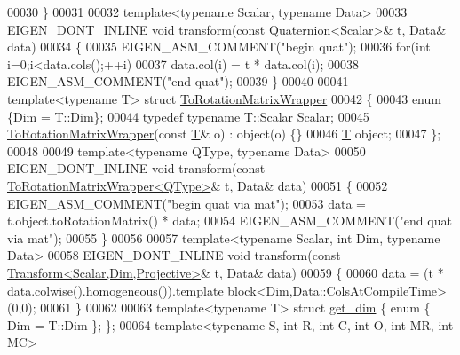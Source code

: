\begin{DoxyCode}
00030 \}
00031 
00032 \textcolor{keyword}{template}<\textcolor{keyword}{typename} Scalar, \textcolor{keyword}{typename} Data>
00033 EIGEN\_DONT\_INLINE \textcolor{keywordtype}{void} transform(\textcolor{keyword}{const} \hyperlink{group___geometry___module_class_eigen_1_1_quaternion}{Quaternion<Scalar>}& t, Data& data)
00034 \{
00035   EIGEN\_ASM\_COMMENT(\textcolor{stringliteral}{"begin quat"});
00036   \textcolor{keywordflow}{for}(\textcolor{keywordtype}{int} i=0;i<data.cols();++i)
00037     data.col(i) = t * data.col(i);
00038   EIGEN\_ASM\_COMMENT(\textcolor{stringliteral}{"end quat"});
00039 \}
00040 
00041 \textcolor{keyword}{template}<\textcolor{keyword}{typename} T> \textcolor{keyword}{struct }\hyperlink{struct_to_rotation_matrix_wrapper}{ToRotationMatrixWrapper}
00042 \{
00043   \textcolor{keyword}{enum} \{Dim = T::Dim\};
00044   \textcolor{keyword}{typedef} \textcolor{keyword}{typename} T::Scalar Scalar;
00045   \hyperlink{struct_to_rotation_matrix_wrapper}{ToRotationMatrixWrapper}(\textcolor{keyword}{const} \hyperlink{group___sparse_core___module}{T}& o) : object(o) \{\}
00046   \hyperlink{group___sparse_core___module}{T} object;
00047 \};
00048 
00049 \textcolor{keyword}{template}<\textcolor{keyword}{typename} QType, \textcolor{keyword}{typename} Data>
00050 EIGEN\_DONT\_INLINE \textcolor{keywordtype}{void} transform(\textcolor{keyword}{const} \hyperlink{struct_to_rotation_matrix_wrapper}{ToRotationMatrixWrapper<QType>}& t, 
      Data& data)
00051 \{
00052   EIGEN\_ASM\_COMMENT(\textcolor{stringliteral}{"begin quat via mat"});
00053   data = t.object.toRotationMatrix() * data;
00054   EIGEN\_ASM\_COMMENT(\textcolor{stringliteral}{"end quat via mat"});
00055 \}
00056 
00057 \textcolor{keyword}{template}<\textcolor{keyword}{typename} Scalar, \textcolor{keywordtype}{int} Dim, \textcolor{keyword}{typename} Data>
00058 EIGEN\_DONT\_INLINE \textcolor{keywordtype}{void} transform(\textcolor{keyword}{const} \hyperlink{group___geometry___module_class_eigen_1_1_transform}{Transform<Scalar,Dim,Projective>}& t,
       Data& data)
00059 \{
00060   data = (t * data.colwise().homogeneous()).\textcolor{keyword}{template} block<Dim,Data::ColsAtCompileTime>(0,0);
00061 \}
00062 
00063 \textcolor{keyword}{template}<\textcolor{keyword}{typename} T> \textcolor{keyword}{struct }\hyperlink{structget__dim}{get\_dim} \{ \textcolor{keyword}{enum} \{ Dim = T::Dim \}; \};
00064 \textcolor{keyword}{template}<\textcolor{keyword}{typename} S, \textcolor{keywordtype}{int} R, \textcolor{keywordtype}{int} C, \textcolor{keywordtype}{int} O, \textcolor{keywordtype}{int} MR, \textcolor{keywordtype}{int} MC>

\end{DoxyCode}
